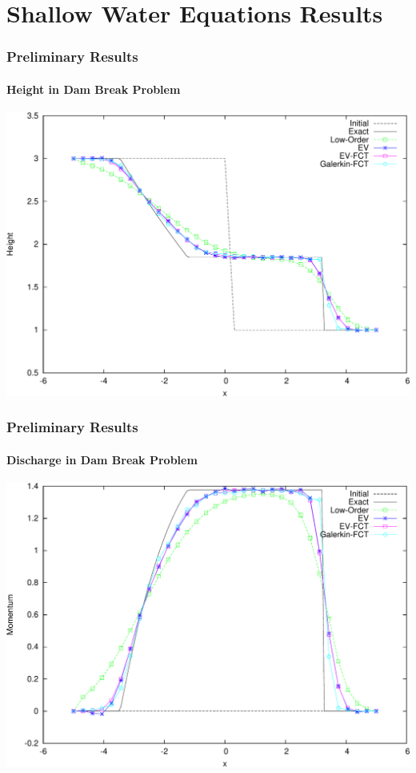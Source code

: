 \documentclass{beamer} \useoutertheme{infolines}
\begin{document}
\section{Shallow Water Equations Results}
\begin{frame}
\frametitle{Preliminary Results}
\framesubtitle{Height in Dam Break Problem}

\begin{center}
\includegraphics[height=0.8\textheight]{./figures/height_FE.pdf}
\end{center}

\end{frame}
\begin{frame}
\frametitle{Preliminary Results}
\framesubtitle{Discharge in Dam Break Problem}

\begin{center}
\includegraphics[height=0.8\textheight]{./figures/momentum_FE.pdf}
\end{center}

\end{frame}
\end{document}
